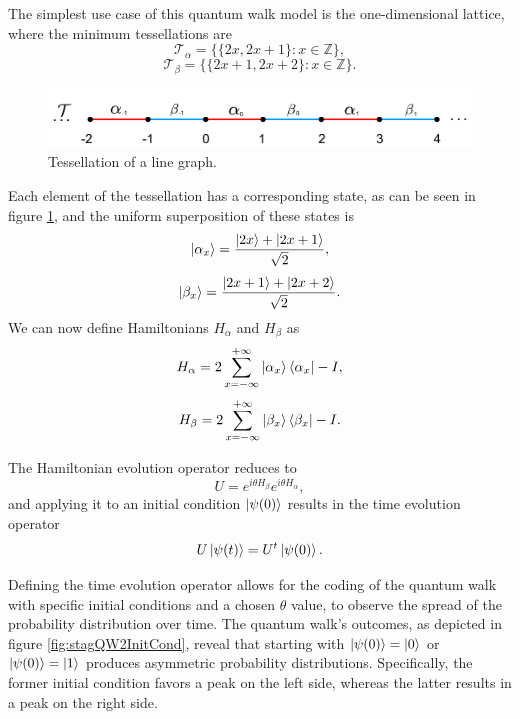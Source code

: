\documentclass[../../main.tex]{subfiles}
\begin{document}
The simplest use case of this quantum walk model is the one-dimensional
lattice, where the minimum tessellations are
\begin{equation}
	\mathscr{T}_{\alpha}= \{\{2x,2x+1\}\colon x \in \mathbb{Z}\},
\end{equation}
\begin{equation}
	\mathscr{T}_{\beta}= \{\{2x+1,2x+2\}\colon x \in \mathbb{Z}\}.
\end{equation}
\begin{figure}[!h]
	\centering
	\includegraphics[scale=0.40]{img/Sec2/tesselation.png}
	\caption{Tessellation of a line graph.} 
	\label{fig:stagQWTesselation}
\end{figure}
Each element of the tessellation has a corresponding state, as can be seen in
figure \ref{fig:stagQWTesselation}, and the uniform superposition of these
states is
\begin{equation}
	\ket{\alpha_x} = \frac{\ket{2x} + \ket{2x+1}}{\sqrt{2}},
\end{equation}
\begin{equation}
	\ket{\beta_x} = \frac{\ket{2x+1}+\ket{2x+2}}{\sqrt{2}}.
\end{equation}
We can now define Hamiltonians $H_\alpha$ and $H_\beta$ as 
\begin{equation}
	H_\alpha = 2\sum_{x=-\infty}^{+\infty}\ket{\alpha_{x}}\bra{\alpha_x} - I,
	\label{eq:stagSimulHalpha}
\end{equation}
\begin{equation}
	H_\beta = 2\sum_{x=-\infty}^{+\infty}\ket{\beta_{x}}\bra{\beta_x} - I.
	\label{eq:stagSimulHbeta}
\end{equation}

The Hamiltonian evolution operator reduces to
\begin{equation}
	U = e^{i\theta H_\beta}e^{i\theta H_\alpha},
	\label{eq:stagSimulUniOp}
\end{equation}
and applying it to an initial condition $\ket{\psi(0)}$ results in the time
evolution operator
\begin{equation}
	U\ket{\psi(t)} = U^t\ket{\psi(0)}.
\end{equation}\par

Defining the time evolution operator allows for the coding of the quantum walk
with specific initial conditions and a chosen $\theta$ value, to observe the
spread of the probability distribution over time. The quantum walk's outcomes,
as depicted in figure \ref{fig:stagQW2InitCond}, reveal that starting with
$\ket{\psi(0)}=\ket{0}$ or $\ket{\psi(0)}=\ket{1}$ produces asymmetric
probability distributions. Specifically, the former initial condition favors a
peak on the left side, whereas the latter results in a peak on the right side.
\end{document}
